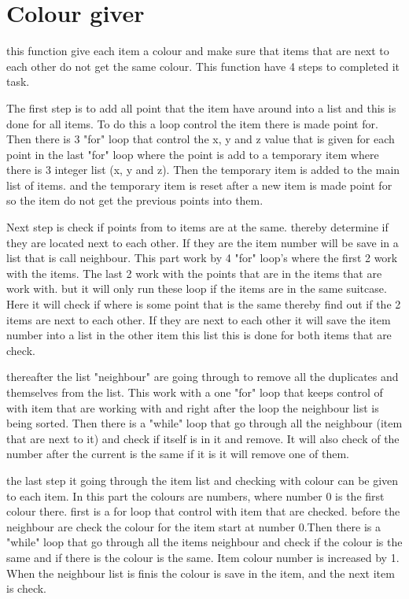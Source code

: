 \section{Colour giver}
this function give each item a colour and make sure that items that are next to each other do not get the same colour. This function have 4 steps to completed it task.

The first step is to add all point that the item have around into a list and this is done for all items. To do this a loop control the item there is made point for. Then there is 3 "for" loop that control the x, y and z value that is given for each point in the last "for" loop where the point is add to a temporary item where there is 3 integer list (x, y and z). Then the temporary item is added to the main list of items. and the temporary item is reset after a new item is made point for so the item do not get the previous points into them.

Next step is check if points from to items are at the same. thereby determine if they are located next to each other. If they are the item number will be save in a list that is call neighbour. This part work by 4 "for" loop's where the first 2 work with the items. The last 2 work with the points that are in the items that are work with. but it will only run these loop if the items are in the same suitcase. Here it will check if where is some point that is the same thereby find out if the 2 items are next to each other. If they are next to each other it will save the item number into a list in the other item this list this is done for both items that are check.


thereafter the list "neighbour" are going through to remove all the duplicates and themselves from the list. This work with a one "for" loop that keeps control of with item that are working with and right after the loop the neighbour list is being sorted. Then there is a "while" loop that go through all the neighbour (item that are next to it) and check if itself is in it and remove. It will also check of the number after the current is the same if it is it will remove one of them.


the last step it going through the item list and checking with colour can be given to each item. In this part the colours are numbers, where number 0 is the first colour there. first is a for loop that control with item that are checked. before the neighbour are check the colour for the item start at number 0.Then there is a "while" loop that go through all the items neighbour and check if the colour is the same and if there is the colour is the same. Item colour number is increased by 1. When the neighbour list is finis the colour is save in the item, and the next item is check.